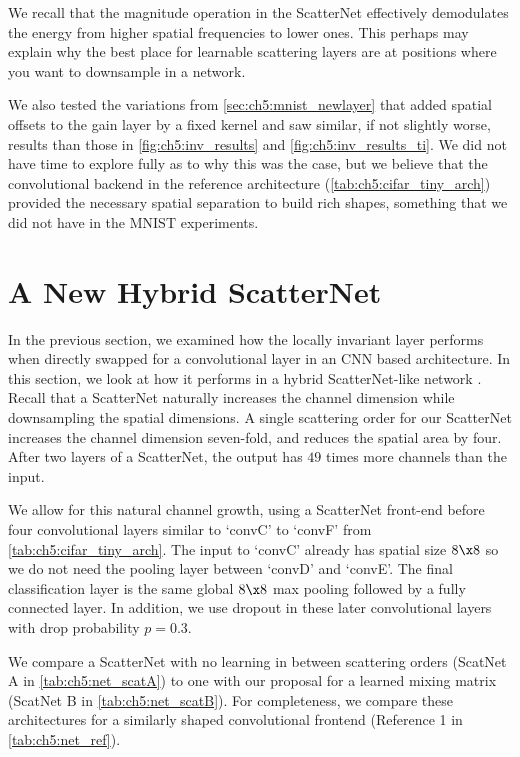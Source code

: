 We recall that the magnitude operation in the ScatterNet effectively
demodulates the energy from higher spatial frequencies to lower ones. This
perhaps may explain why the best place for learnable scattering layers
are at positions where you want to downsample in a network.

We also tested the variations from \autoref{sec:ch5:mnist_newlayer} that added
spatial offsets to the gain layer by a fixed kernel and saw similar, if not
slightly worse, results than those in \autoref{fig:ch5:inv_results} and
\autoref{fig:ch5:inv_results_ti}. We did not
have time to explore fully as to why this was the case, but we believe that the
convolutional backend in the reference architecture (\autoref{tab:ch5:cifar_tiny_arch})
provided the necessary spatial separation to build rich shapes, something that
we did not have in the MNIST experiments.

\section{A New Hybrid ScatterNet}\label{sec:ch5:scat_exp}


In the previous section, we examined how the locally invariant layer performs when
directly swapped for a convolutional layer in an CNN based architecture.
In this section, we look at how it performs in a hybrid ScatterNet-like network
\cite{oyallon_hybrid_2017,oyallon_scaling_2017}. Recall that a ScatterNet
naturally increases the channel dimension while downsampling the spatial
dimensions. A single scattering order for our ScatterNet increases the channel dimension 
seven-fold, and reduces the spatial area by four. After two layers of a
ScatterNet, the output has $49$ times more channels than the input.

We allow for this natural channel growth, using a ScatterNet front-end before
four convolutional layers similar to `convC' to `convF' from
\autoref{tab:ch5:cifar_tiny_arch}. The input to `convC' already has spatial size
$8\x 8$ so we do not need the pooling layer between `convD' and `convE'. The
final classification layer is the same global $8\x 8$ max pooling followed by a
fully connected layer. In addition, we use dropout in these later convolutional
layers with drop probability $p=0.3$.

We compare a ScatterNet with no learning in between scattering orders (ScatNet A
in \autoref{tab:ch5:net_scatA}) to one with our proposal for a learned mixing
matrix (ScatNet B in \autoref{tab:ch5:net_scatB}). For completeness, we
compare these architectures for a similarly shaped convolutional frontend
(Reference 1 in \autoref{tab:ch5:net_ref}).

